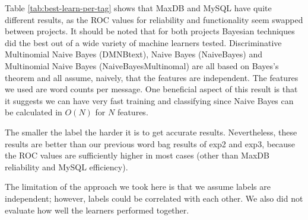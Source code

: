 \documentclass{acm_proc_article-sp}
\begin{document}
Table \ref{tab:best-learn-per-tag} shows that MaxDB and MySQL have quite different results, as the ROC values for reliability and functionality seem swapped between projects. It should be noted that for both projects Bayesian techniques did the best out of a wide variety of machine learners tested. Discriminative Multinomial Naive Bayes (DMNBtext), Naive Bayes (NaiveBayes) and Multinomial Naive Bayes (NaiveBayesMultinomal) are all based on Bayes's theorem and all assume, naively, that the features are independent. The features we used are word counts per message. One beneficial aspect of this result is that it suggests we can have very fast training and classifying  since Naive Bayes can be calculated in $O(N)$ for $N$ features.

The smaller the label the harder it is to get accurate results. Nevertheless, these results are better than our previous word bag results of \textsf{exp2} and \textsf{exp3}, because the ROC values are sufficiently higher in most cases (other than MaxDB reliability and MySQL efficiency).

The limitation of the approach we took here is that we assume labels are independent; however, labels could be correlated with each other. We also did not evaluate how well the learners performed together.
\end{document}
